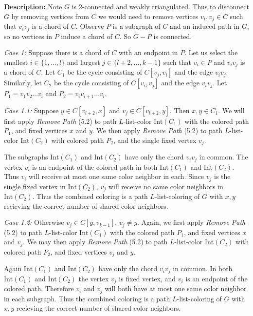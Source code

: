 \documentclass[letterpaper, 12pt]{article}
\theoremstyle{definition}
\theoremstyle{definition}
\theoremstyle{thm}
\theoremstyle{definition}
\begin{document}
\noindent\textbf{Description:}
Note $G$ is $2$-connected and weakly triangulated. Thus to disconnect $G$ by
removing vertices from $C$ we would need to remove vertices
$v_i,v_j\in C$ such that $v_iv_j$ is a chord of $C$.
Observe $P$ is a subgraph of $C$ and an induced path in $G$, so no vertices in
$P$ induce a chord of $C$. So $G-P$ is connected.

\textit{Case 1:} Suppose there is a chord of $C$ with an endpoint in $P$. Let us
select the smallest $i\in\{1,\ldots,l\}$ and largest $j\in\{l+2,\ldots,k-1\}$
such that $v_i\in P$ and $v_iv_j$ is a chord of $C$. Let $C_1$ be the cycle
consisting of $C[v_j,v_i]$ and the edge $v_iv_j$. Similarly, let $C_2$ be the
cycle consisting of $C[v_i,v_j]$ and the edge $v_iv_j$. Let
$P_1=v_1v_2\ldots v_i$ and $P_2=v_iv_{i+1}\ldots v_l$.

\textit{Case 1.1:} Suppose $y\in C[v_{l+2},x]$ and $v_j\in C[v_{l+2},y]$.
Then $x,y\in C_1$. We will first apply \textit{Remove Path} (5.2) to path
$L$-list-color $\text{Int}(C_1)$ with the colored path $P_1$, and fixed vertices
$x$ and $y$. We then apply \textit{Remove Path} (5.2)
to path $L$-list-color $\text{Int}(C_2)$ with colored path $P_2$, and the single
fixed vertex $v_j$.

The subgraphs $\text{Int}(C_1)$ and $\text{Int}(C_2)$ have only the chord
$v_iv_j$ in common. The vertex $v_i$ is an endpoint of the colored path in both
$\text{Int}(C_1)$ and $\text{Int}(C_2)$. Thus $v_i$ will receive at most one
same color neighbor in each. Since $v_j$ is the single fixed vertex in
$\text{Int}(C_2)$, $v_j$ will receive no same color neighbors in
$\text{Int}(C_2)$. Thus the combined coloring is a path $L$-list-coloring of
$G$ with $x,y$ recieving the correct number of shared color neighbors.

\textit{Case 1.2:} Otherwise $v_j\in C[y,v_{k-1}]$, $v_j\ne y$. Again, we first
apply \textit{Remove Path} (5.2) to path $L$-list-color $\text{Int}(C_1)$ with
the colored path $P_1$, and fixed vertices $x$ and $v_j$.
We may then apply \textit{Remove Path} (5.2) to path $L$-list-color
$\text{Int}(C_2)$ with colored path $P_2$, and fixed vertices $v_j$ and $y$.

Again $\text{Int}(C_1)$ and $\text{Int}(C_2)$ have only the chord $v_iv_j$ in
common. In both $\text{Int}(C_1)$ and $\text{Int}(C_2)$ the vertex $v_j$ is
fixed vertex, and $v_i$ is an endpoint of the colored path. Therefore $v_i$ and
$v_j$ will both have at most one same color neighbor in each subgraph. Thus the
combined coloring is a path $L$-list-coloring of $G$ with $x,y$ recieving the
correct number of shared color neighbors.
\end{document}
